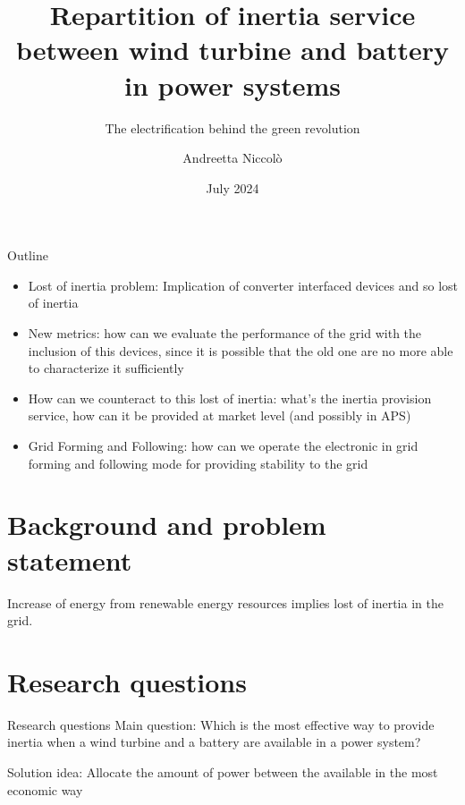 \documentclass[aspectratio=169, 12pt]{beamer}
\title{ Repartition of inertia service between wind turbine and battery in power systems }
\subtitle{The electrification behind the green revolution}
\author{Andreetta Niccolò}
\date{July 2024}
\begin{document}
  \maketitle

  \begin{frame}[fragile]{Outline}
    \tableofcontents
  \end{frame}

  \begin{frame}
    \begin{itemize}
      \item Lost of inertia problem: Implication of converter interfaced devices and so lost of inertia
      \item New metrics: how can we evaluate the performance of the grid with the inclusion of this devices, since it is possible that the old one are no more able to characterize it sufficiently
      \item How can we counteract to this lost of inertia: what's the inertia provision service, how can it be provided at market level (and possibly in APS)
      \item Grid Forming and Following: how can we operate the electronic in grid forming and following mode for providing stability to the grid
    \end{itemize}
  \end{frame}

  \section{Background and problem statement}
  \begin{frame}{\insertsection}
    Increase of energy from renewable energy resources implies lost of inertia in the grid. 

  \end{frame}
  
  \section{Research questions}
  \begin{frame}{Research questions}
    \textcolor{NTNUBlue}{Main question}: Which is the most effective way to provide inertia when a wind turbine and a battery are available in a power system?
    
    \textcolor{NTNUOrange}{Solution idea}: Allocate the amount of power between the available in the most economic way
  \end{frame}
\end{document}
